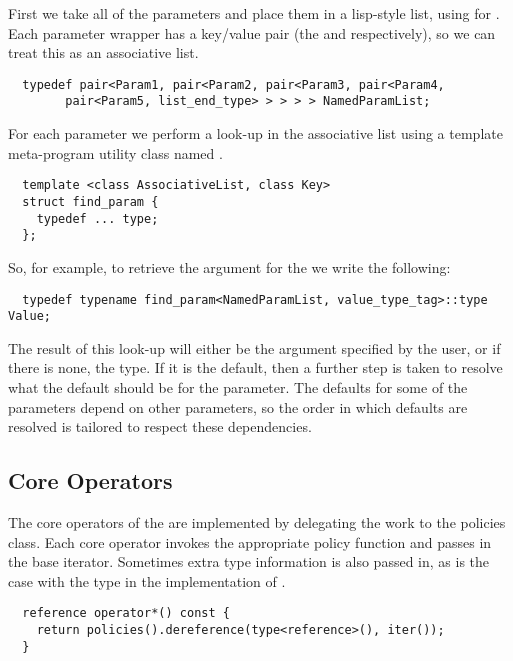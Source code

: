 \documentclass{netobjectdays}
\begin{document}
First we take all of the parameters and place them in a
lisp-style list, using  for . Each
parameter wrapper has a key/value pair (the  and 
respectively), so we can treat this as an associative list.

{\footnotesize
\begin{verbatim} 
  typedef pair<Param1, pair<Param2, pair<Param3, pair<Param4,
	    pair<Param5, list_end_type> > > > > NamedParamList;
\end{verbatim} 
}

\noindent For each parameter we perform a look-up in the associative
list using a template meta-program utility class named
.

{\footnotesize
\begin{verbatim} 
  template <class AssociativeList, class Key>
  struct find_param {
    typedef ... type;
  };
\end{verbatim} 
}

\noindent So, for example, to retrieve the argument for the
 we write the following:

{\footnotesize
\begin{verbatim} 
  typedef typename find_param<NamedParamList, value_type_tag>::type Value;
\end{verbatim} 
}

The result of this look-up will either be the argument specified by the
user, or if there is none, the  type. If it is
the default, then a further step is taken to resolve what the default
should be for the parameter. The defaults for some of the parameters
depend on other parameters, so the order in which defaults are
resolved is tailored to respect these dependencies.


\subsection{Core Operators}

The core operators of the  are implemented by
delegating the work to the policies class. Each core operator invokes
the appropriate policy function and passes in the base
iterator. Sometimes extra type information is also passed in, as is
the case with the  type in the implementation of
.

{\footnotesize
\begin{verbatim}
  reference operator*() const {
    return policies().dereference(type<reference>(), iter());
  }
\end{verbatim}
}
\end{document}
